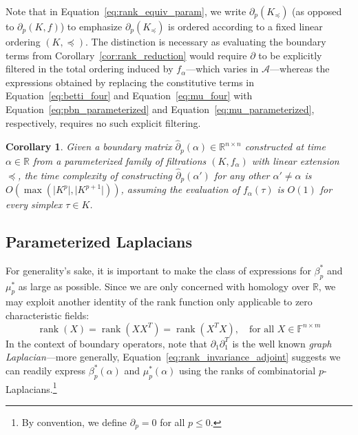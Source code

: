 \documentclass[pdflatex,sn-mathphys-num]{sn-jnl}
\newtheorem{corollary}{Corollary}
\begin{document}
\noindent Note that in Equation~\ref{eq:rank_equiv_param}, we write \(\partial_{p} \left( K_{\preceq} \right) \) (as opposed to \(\partial_{p}(K,f)\)) to emphasize \(\partial_{p} \left( K_{\preceq} \right) \) is ordered according to a fixed linear ordering \( (K, \preceq ) \). The distinction is necessary as evaluating the boundary terms from Corollary~\ref{cor:rank_reduction} would require \(\partial\) to be explicitly filtered in the total ordering induced by \(f_{\alpha}\)---which varies in \(\mathcal{A}\)---whereas the expressions obtained by replacing the constitutive terms in Equation~\ref{eq:betti_four} and Equation~\ref{eq:mu_four} with Equation~\ref{eq:pbn_parameterized} and Equation~\ref{eq:mu_parameterized}, respectively, requires no such explicit filtering.

\begin{corollary}
Given a boundary matrix $\hat{\partial}_p(\alpha) \in \mathbb{R}^{n \times n}$ constructed at time $\alpha \in \mathbb{R}$ from a parameterized family of filtrations $(K , f_\alpha)$ with linear extension $\preceq$, the time complexity of constructing $\hat{\partial}_p(\alpha')$ for any other $\alpha' \neq \alpha$ is $O\left( \max (\lvert K^p \rvert, \lvert K^{p + 1} \rvert ) \right)$, assuming the evaluation of $f_\alpha (\tau)$ is $O (1)$ for every simplex $\tau \in K$.
\end{corollary}

\subsection{Parameterized Laplacians}\label{sec:laplacian_theory2}

For generality's sake, it is important to make the class of expressions for \(\beta_{p}^{\ast}\) and \(\mu_{p}^{\ast}\) as large as possible. Since we are only concerned with homology over \(\mathbb{R}\), we may exploit another identity of the rank function only applicable to zero characteristic fields:
\[\label{eq:rank_invariance_adjoint}
\operatorname{rank}(X) = \operatorname{rank} \left( XX^{T} \right)  = \operatorname{rank} \left( X^{T}X \right) ,\quad\text{for all }X \in \mathbb{F}^{n \times m}
\] 
\noindent In the context of boundary operators, note that \(\partial_{1}\partial_{1}^{T}\) is the well known \emph{graph Laplacian}---more generally, Equation~\ref{eq:rank_invariance_adjoint} suggests we can readily express \(\beta_{p}^{\ast}(\alpha)\) and \(\mu_{p}^{\ast}(\alpha)\) using the ranks of combinatorial \(p\)-Laplacians.\footnote{By convention, we define \(\partial_{p} = 0\) for all \(p \leq 0\).}
\end{document}
